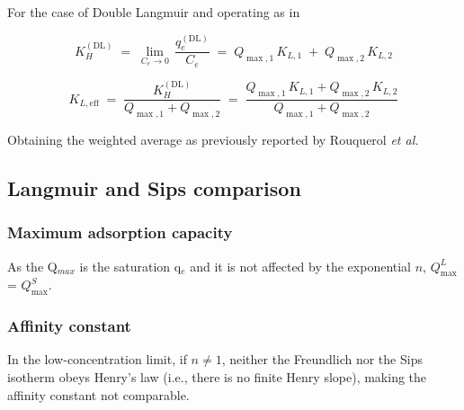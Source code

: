 \documentclass[journal=jacsat,manuscript=article]{achemso}
\begin{document}
For the case of Double Langmuir  and operating as in 

\begin{equation}
	K_H^{(\mathrm{DL})} \;=\; \lim_{C_e \to 0}\,\frac{q_e^{(\mathrm{DL})}}{C_e}
	\;=\; Q_{\max,1}\,K_{L,1} \;+\; Q_{\max,2}\,K_{L,2}
\end{equation}

\begin{equation}
	K_{L,\mathrm{eff}} \;=\; \frac{K_H^{(\mathrm{DL})}}{Q_{\max,1}+Q_{\max,2}}
	\;=\; \frac{Q_{\max,1}\,K_{L,1} + Q_{\max,2}\,K_{L,2}}{Q_{\max,1}+Q_{\max,2}}
	\label{eq:KL-eff}
\end{equation}

Obtaining the weighted average as previously reported by  Rouquerol \textit{et al.}  \cite{rouquerol_adsorption_2013}

\subsection{Langmuir and Sips comparison} \label{section:L-S_comparison}
\subsubsection{Maximum adsorption capacity}

As the Q$_{max}$ is the saturation q$_e$ and it is not affected by the exponential $n$, $Q_{\text{max}}^L$ = $Q_{\text{max}}^S$.

\subsubsection{Affinity constant} \label{Aff_const}



In the low-concentration limit, if \(n \neq 1\), neither the Freundlich nor the Sips isotherm obeys Henry's law (i.e., there is no finite Henry slope), making the affinity constant not comparable.
\end{document}
